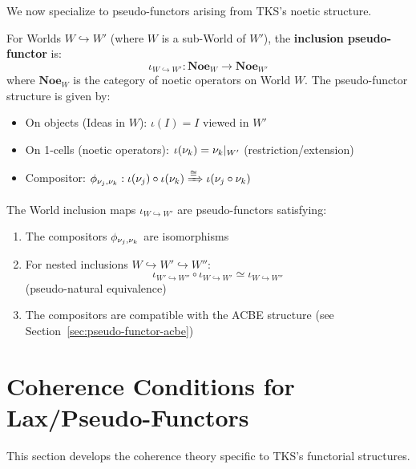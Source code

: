 We now specialize to pseudo-functors arising from TKS's noetic structure.

\begin{definition}
\label{def:world-inclusion-pseudo}
For Worlds $W \hookrightarrow W'$ (where $W$ is a sub-World of $W'$), the
\textbf{inclusion pseudo-functor} is:
\[
  \iota_{W \hookrightarrow W'} : \mathbf{Noe}_W \to \mathbf{Noe}_{W'}
\]
where $\mathbf{Noe}_W$ is the category of noetic operators on World $W$.
The pseudo-functor structure is given by:
\begin{itemize}
  \item On objects (Ideas in $W$): $\iota(I) = I$ viewed in $W'$
  \item On 1-cells (noetic operators): $\iota(\nu_{k}) = \nu_{k}|_{W'}$ (restriction/extension)
  \item Compositor: $\phi_{\nu_{j}, \nu_{k}} : \iota(\nu_{j}) \circ \iota(\nu_{k}) \xRightarrow{\cong} \iota(\nu_{j} \circ \nu_{k})$
\end{itemize}
\end{definition}

\begin{proposition}
\label{prop:noetic-inclusion-pseudo}
The World inclusion maps $\iota_{W \hookrightarrow W'}$ are pseudo-functors
satisfying:
\begin{enumerate}[label=(\alph*)]
  \item The compositors $\phi_{\nu_{j}, \nu_{k}}$ are isomorphisms
  \item For nested inclusions $W \hookrightarrow W' \hookrightarrow W''$:
        \[
          \iota_{W' \hookrightarrow W''} \circ \iota_{W \hookrightarrow W'} \simeq \iota_{W \hookrightarrow W''}
        \]
        (pseudo-natural equivalence)
  \item The compositors are compatible with the ACBE structure (see Section~\ref{sec:pseudo-functor-acbe})
\end{enumerate}
\end{proposition}

\section{Coherence Conditions for Lax/Pseudo-Functors}
\label{sec:coherence-conditions}

This section develops the coherence theory specific to TKS's functorial structures.

